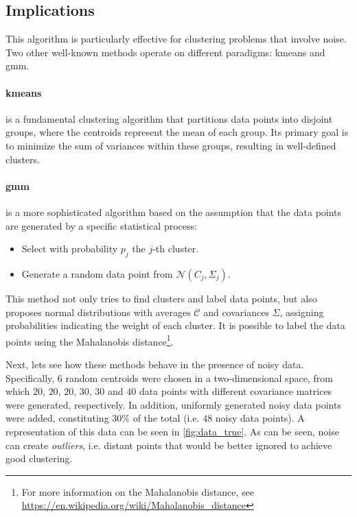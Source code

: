 \subsection{Implications}
This algorithm is particularly effective for clustering problems that involve noise. Two other well-known methods operate on different paradigms: \gls{kmeans} and \gls{gmm}.

\paragraph{\gls{kmeans}} is a fundamental clustering algorithm that partitions data points into disjoint groups, where the centroids represent the mean of each group. Its primary goal is to minimize the sum of variances within these groups, resulting in well-defined clusters.

\paragraph{\gls{gmm}} is a more sophisticated algorithm based on the assumption that the data points are generated by a specific statistical process:
\begin{itemize}
    \item[1] Select with probability $p_j$ the $j$-th cluster.
    \item[2] Generate a random data point from $\mathcal{N}(C_j, \Sigma_j)$.
\end{itemize}
This method not only tries to find clusters and label data points, but also proposes normal distributions with averages $\mathcal{C}$ and covariances $\Sigma$, assigning probabilities indicating the weight of each cluster. It is possible to label the data points using the Mahalanobis distance\footnote{For more information on the Mahalanobis distance, see \url{https://en.wikipedia.org/wiki/Mahalanobis_distance}}.

\bigskip
Next, lets see how these methods behave in the presence of noisy data. Specifically, $6$ random centroids were chosen in a two-dimensional space, from which $20$, $20$, $20$, $30$, $30$ and $40$ data points with different covariance matrices were generated, respectively. In addition, uniformly generated noisy data points were added, constituting $30\%$ of the total (i.e. $48$ noisy data points). A representation of this data can be seen in \cref{fig:data_true}. As can be seen, noise can create \textit{outliers}, i.e. distant points that would be better ignored to achieve good clustering.

